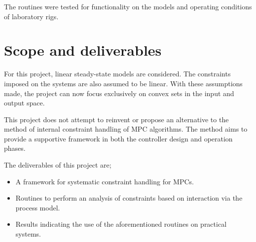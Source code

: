 The routines were tested for functionality on the models and operating conditions of laboratory rigs.

\section{Scope and deliverables}
For this project, linear steady-state models are considered.
The constraints imposed on the systems are also assumed to be linear.
With these assumptions made, the project can now focus exclusively on convex sets in the input and output space.

This project does not attempt to reinvent or propose an alternative to the method of internal constraint handling of MPC algorithms.
The method aims to provide a supportive framework in both the controller design and operation phases.

The deliverables of this project are;
\begin{itemize}
\item A framework for systematic constraint handling for MPCs.
\item Routines to perform an analysis of constraints based on interaction via the process model.
\item Results indicating the use of the aforementioned routines on practical systems.
\end{itemize}

